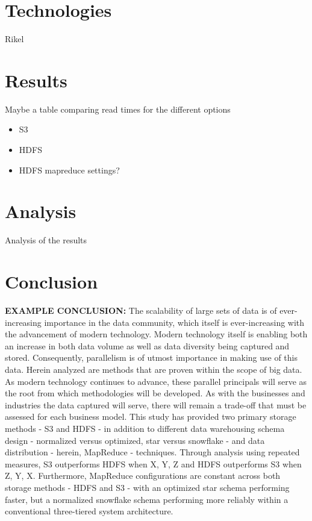 \documentclass[journal]{IEEEtran}
\begin{document}
\section{Technologies}

Rikel

\section{Results}



Maybe a table comparing read times for the different options

\begin{itemize}
	\item S3
	\item HDFS
	\item HDFS mapreduce settings?
\end{itemize}

\section{Analysis}

Analysis of the results


\section{Conclusion}
\textbf{EXAMPLE CONCLUSION:}
The scalability of large sets of data is of ever-increasing importance in the data community, which itself is ever-increasing with the advancement of modern technology. Modern technology itself is enabling both an increase in both data volume as well as data diversity being captured and stored. Consequently, parallelism is of utmost importance in making use of this data. Herein analyzed are methods that are proven within the scope of big data. As modern technology continues to advance, these parallel principals will serve as the root from which methodologies will be developed. As with the businesses and industries the data captured will serve, there will remain a trade-off that must be assessed for each business model. This study has provided two primary storage methods - S3 and HDFS - in addition to different data warehousing schema design - normalized versus optimized, star versus snowflake - and data distribution - herein, MapReduce - techniques. Through analysis using repeated measures, S3 outperforms HDFS when X, Y, Z and HDFS outperforms S3 when Z, Y, X. Furthermore, MapReduce configurations are constant across both storage methods - HDFS and S3 - with an optimized star schema performing faster, but a normalized snowflake schema performing more reliably within a conventional three-tiered system architecture.
\end{document}
